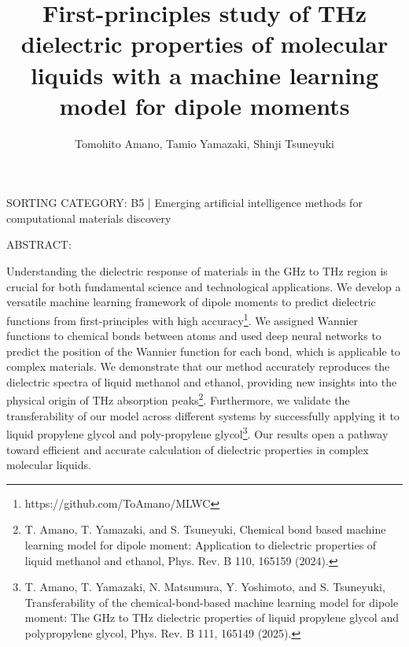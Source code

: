 \documentclass[11pt]{article}
\title{First-principles study of THz dielectric properties of molecular liquids with a machine learning model for dipole moments}
\author{Tomohito Amano, Tamio Yamazaki, Shinji Tsuneyuki}
\begin{document}
\maketitle



SORTING CATEGORY: B5 | Emerging artificial intelligence methods for computational materials discovery

ABSTRACT:

Understanding the dielectric response of materials in the GHz to THz region is crucial for both fundamental science and technological applications. We develop a versatile machine learning framework of dipole moments to predict dielectric functions from first-principles with high accuracy\footnote{https://github.com/ToAmano/MLWC}. We assigned Wannier functions to chemical bonds between atoms and used deep neural networks to predict the position of the Wannier function for each bond, which is applicable to complex materials. We demonstrate that our method accurately reproduces the dielectric spectra of liquid methanol and ethanol, providing new insights into the physical origin of THz absorption peaks\footnote{T. Amano, T. Yamazaki, and S. Tsuneyuki, Chemical bond based machine learning model for dipole moment: Application to dielectric properties of liquid methanol and ethanol, Phys. Rev. B 110, 165159 (2024).}. Furthermore, we validate the transferability of our model across different systems by successfully applying it to liquid propylene glycol and poly-propylene glycol\footnote{T. Amano, T. Yamazaki, N. Matsumura, Y. Yoshimoto, and S. Tsuneyuki, Transferability of the chemical-bond-based machine learning model for dipole moment: The GHz to THz dielectric properties of liquid propylene glycol and polypropylene glycol, Phys. Rev. B 111, 165149 (2025).}. Our results open a pathway toward efficient and accurate calculation of dielectric properties in complex molecular liquids.
\end{document}
